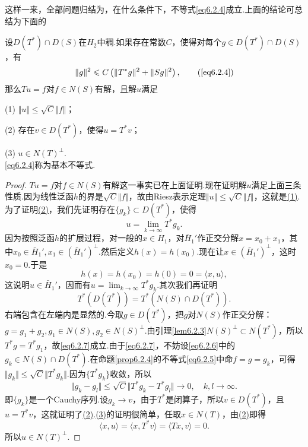这样一来，全部问题归结为，在什么条件下，不等式\eqref{eq6.2.4}成立.上面的结论可总结为下面的
\begin{theorem}\label{thm6.2.5}
	设$D(T^\ast)\cap D(S)$在$H_2$中稠.如果存在常数$C$，使得对每个$g\in D(T^\ast)\cap D(S)$，有
	\begin{equation}
		\Vert g\Vert^2\le C\left(\Vert T^\ast g\Vert^2+\Vert Sg\Vert^2\right),\tag{\ref{eq6.2.4}}
	\end{equation}
	那么$Tu=f$对$f\in N(S)$有解，且解$u$满足
	
	(1)\hypertarget{6.2.5}{}
	$\Vert u\Vert\le\sqrt{C}\Vert f\Vert$；
	
	(2)\hypertarget{6.2.5}{}
	存在$v\in D(T^\ast)$，使得$u=T^\ast v$；
	
	(3)\hypertarget{6.2.5}{}
	$u\in N(T)^\perp$.\\
	\eqref{eq6.2.4}称为基本不等式.
\end{theorem}
\begin{proof}
	$Tu=f$对$f\in N(S)$有解这一事实已在上面证明.现在证明解$u$满足上面三条性质.因为线性泛函$h$的界是$\sqrt{C}\Vert f\Vert$，故由Riesz表示定理$\Vert u\Vert\le\sqrt{C}\Vert f\Vert$，这就是\hyperlink{6.2.5}{(1)}.为了证明\hyperlink{6.2.5}{(2)}，我们先证明存在$\{g_k\}\subset D(T^\ast)$，使得
	\begin{equation}\label{eq6.2.6}
		u=\lim_{k\to\infty} T^\ast g_k.
	\end{equation}
因为按照泛函$h$的扩展过程，对一般的$x\in H_1$，对$\bar{H}_1'$作正交分解$x=x_0+x_1$，其中$x_0\in \bar{H}_1',x_1\in\left(\bar{H}_1'\right)^\perp$.然后定义$h(x)=h(x_0)$.现在让$x\in\left(\bar{H}_1'\right)^\perp$，这时$x_0=0$.于是
\[h(x)=h(x_0)=h(0)=0=\langle x,u\rangle,\]
这说明$u\in\bar{H}_1'$，因而有$u=\lim_{k\to\infty} T^\ast g_k$.其次我们再证明
\begin{equation}\label{eq6.2.7}
	T^\ast(D(T^\ast))=T^\ast(N(S)\cap D(T^\ast)).
\end{equation}
右端包含在左端内是显然的.今取$g\in D(T^\ast)$，把$g$对$N(S)$作正交分解：$g=g_1+g_2,g_1\in N(S),g_2\in N(S)^\perp$.由引理\ref{lem6.2.3}$N(S)^\perp\subset N(T^\ast)$，所以$T^\ast g=T^\ast g_1$，故\eqref{eq6.2.7}成立.由于\eqref{eq6.2.7}，不妨设\eqref{eq6.2.6}中的$g_k\in N(S)\cap D(T^\ast)$.在命题\ref{prop6.2.4}的不等式\eqref{eq6.2.5}中命$f=g=g_k$，可得$\Vert g_k\Vert\le\sqrt{C}\Vert T^\ast g_k\Vert$.因为$\{T^\ast g_k\}$收敛，所以
\[\Vert g_k-g_l\Vert\le\sqrt{C}\Vert T^\ast g_k-T^\ast g_l\Vert\to0,\quad k,l\to\infty.\]
即$\{g_k\}$是一个Cauchy序列.设$g_k\to v$，由于$T^\ast$是闭算子，所以$v\in D(T^\ast)$，且$u=T^\ast v$，这就证明了\hyperlink{6.2.5}{(2)}.\hyperlink{6.2.5}{(3)}的证明很简单，任取$x\in N(T)$，由\hyperlink{6.2.5}{(2)}即得
\[\langle x,u\rangle=\langle x,T^\ast v\rangle=\langle Tx,v\rangle=0.\]
所以$u\in N(T)^\perp$.
\end{proof}
